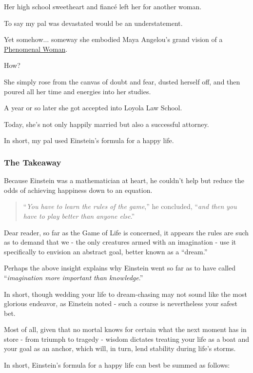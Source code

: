 \documentclass{article}
\begin{document}
Her high school sweetheart and fiancé left her for another woman.

To say my pal was devastated would be an understatement.

Yet somehow$\ldots$ someway she embodied Maya Angelou's grand vision of a \href{https://www.poetryfoundation.org/poems/48985/phenomenal-woman}{Phenomenal Woman}.

%
How?

%
She simply rose from the canvas of doubt and fear, dusted herself off, and then poured all her time and energies into her studies.

A year or so later she got accepted into Loyola Law School.

%
Today, she's not only happily married but also a successful attorney.

In short, my pal used Einstein's formula for a happy life.

\subsubsection{The Takeaway}
Because Einstein was a mathematician at heart, he couldn't help but reduce the odds of achieving happiness down to an equation.

\begin{quotation}
	``\textit{You have to learn the rules of the game},'' he concluded, ``\textit{and then you have to play better than anyone else}.''
\end{quotation}
Dear reader, so far as the Game of Life is concerned, it appears the rules are such as to demand that we - the only creatures armed with an imagination - use it specifically to envision an abstract goal, better known as a ``dream.''

%
Perhaps the above insight explains why Einstein went so far as to have called ``\textit{imagination more important than knowledge}.''

In short, though wedding your life to dream-chasing may not sound like the most glorious endeavor, as Einstein noted - such a course is nevertheless your safest bet.

%
Most of all, given that no mortal knows for certain what the next moment has in store - from triumph to tragedy - wisdom dictates treating your life as a boat and your goal as an anchor, which will, in turn, lend stability during life's storms.

%
In short, Einstein's formula for a happy life can best be summed as follows:
\end{document}
